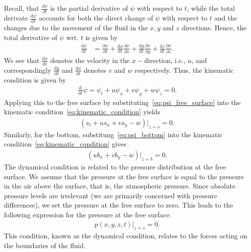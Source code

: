 Recall, that $\frac{\partial \psi}{\partial t}$ is the partial derivative of $\psi$ with respect to $t$, while the total derivate $\frac{\text{d} \psi}{\text{d} t}$ accounts for both the direct change of $\psi$ with respect to $t$ and the changes due to the movement of the fluid in the $x, y$ and $z$ directions.
Hence, the total derivative of $\psi$ wrt. $t$ is given by
\begin{align*}
    \frac{\text{d} \psi}{\text{d} t} &= \frac{\partial \psi}{\partial t} + \frac{\text{d} x}{\text{d} t} \frac{\partial \psi}{\partial x} + \frac{\text{d} y}{\text{d} t}  \frac{\partial \psi}{\partial y} + \frac{\text{d} z}{\text{d} t}  \frac{\partial \psi}{\partial z}.
\end{align*}
We see that $\frac{\text{d}x}{\text{d}t}$ denotes the velocity in the $x-$direction, i.e., $u$, and correspondingly $\frac{\text{d}y}{\text{d}t}$ and $\frac{\text{d}x}{\text{d}t}$ denotes $v$ and $w$ respectively.
Thus, the kinematic condition is given by
\begin{align}\label{eq:kinematic_condition}
    \frac{\text{d} }{\text{d} t} \psi = \psi_t + u \psi_x + v \psi_y + w \psi_z = 0.
\end{align}
Applying this to the free surface by substituting~\eqref{eq:psi_free_surface} into the kinematic condition~\eqref{eq:kinematic_condition} yields
\begin{align}\label{eq:kinematic_condition_free_surface}
    (s_t + u s_x + v s_y - w)|_{z=s} = 0.
\end{align}
Similarly, for the bottom, substitung~\eqref{eq:psi_bottom} into the kinematic condition~\eqref{eq:kinematic_condition} gives
\begin{align}\label{eq:kinematic_condition_bottom}
    (u b_x + v b_y - w)|_{z=b} = 0.
\end{align}
The dynamical condition is related to the pressure distribution at the free surface.
We assume that the pressure at the free surface is equal to the pressure in the air above the surface, that is, the atmospheric pressure.
Since absolute pressure levels are irrelevant (we are primarily concerned with pressure differences), we set the pressure at the free surface to zero.
This leads to the following expression for the pressure at the free surface:
\begin{align}\label{eq:pressure_free_surface}
    p(x,y,z,t)|_{z = s} = 0.
\end{align}
This condition, known as the dynamical condition, relates to the forces acting on the boundaries of the fluid.

